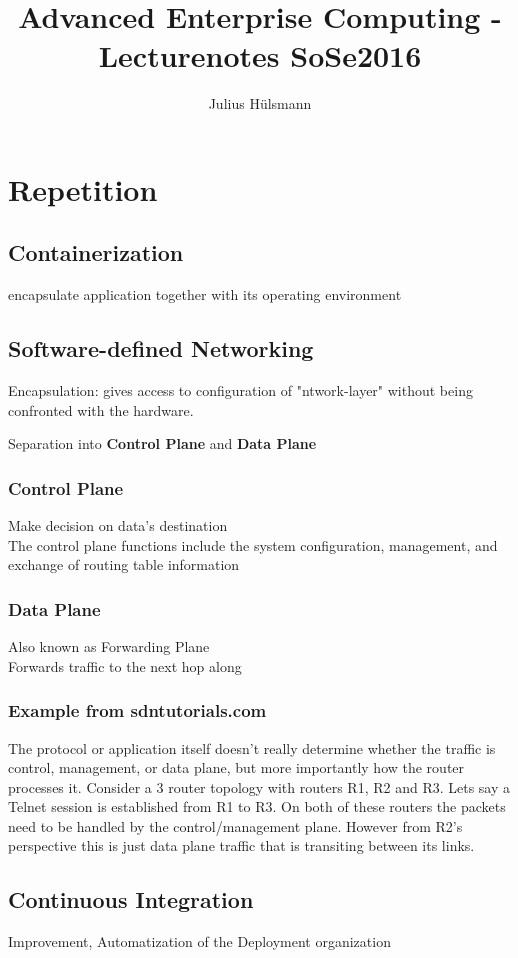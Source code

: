 \documentclass[a4paper,12pt]{article}%
\title{Advanced Enterprise Computing - Lecturenotes SoSe2016}
\author{Julius Hülsmann}
\begin{document}
  \maketitle
  \tableofcontents
  \newpage

\section{Repetition}
\subsection{Containerization}
encapsulate application together with its operating environment
\subsection{Software-defined Networking}
Encapsulation: gives access to configuration of "ntwork-layer" without being confronted with the hardware. 


Separation into {\bf Control Plane} and {\bf Data Plane}
\subsubsection{Control Plane}
Make decision on data's destination\\
The control plane functions include the system configuration, management, and exchange of routing table information
\subsubsection{Data Plane}
Also known as Forwarding Plane\\
Forwards traffic to the next hop along
\subsubsection{Example from sdntutorials.com}
The protocol or application itself doesn't really determine whether the traffic is control, management, or data plane, but more importantly how the router processes it. Consider a 3 router topology with routers R1, R2 and R3. 
Lets say a Telnet session is established from R1 to R3. On both of these routers the packets need to be handled by the control/management plane. However from R2's perspective this is just data plane traffic that is transiting between its links.


\subsection{Continuous Integration}
Improvement, Automatization of the Deployment organization
\end{document}
